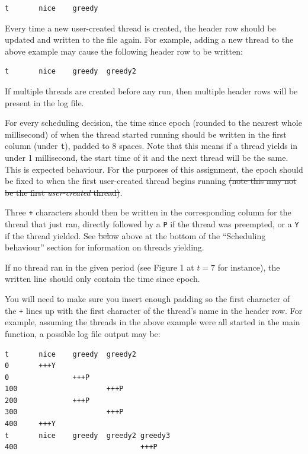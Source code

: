 \documentclass[12pt,a4paper]{article}
\begin{document}
\begin{verbatim}
t       nice    greedy
\end{verbatim}

Every time a new {\color{blue}user-created} thread is created, the header row should be updated and
written to the file again. For example, adding a new thread  to the above
example may cause the following header row to
be written:

\begin{verbatim}
t       nice    greedy  greedy2
\end{verbatim}

If multiple threads are created before any run, then multiple header rows will
be present in the log file.

For every scheduling decision, the time since epoch (rounded to the nearest
whole millisecond) of when the thread started running should be written in the
first column (under \texttt{t}), padded to 8 spaces. Note that this means if
a thread yields in under 1 millisecond, the start time of it and the next thread
will be the same. This is expected behaviour. For the purposes of this
assignment, the epoch should be fixed to when the first {\color{blue} user-created} thread begins running
{\color{blue}\sout{(note this may not be the first \textit{user-created} thread)}}.

Three \texttt{+} characters should then be written in the corresponding column
for the thread that just ran, directly followed by a \texttt{P} if the thread
was preempted, or a \texttt{Y} if the thread yielded.  See
{\color{red}\sout{below} above at the bottom of the ``Scheduling behaviour''
section} for information on threads yielding.

{\color{red}If no thread ran in the given period (see Figure 1 at $t=7$ for instance),
the written line should only contain the time since epoch.}

You will need to make sure you insert enough padding so the first character of
the \texttt{+} lines up with the first character of the thread's name in the
header row. For example, assuming the threads in the above example were
all started in the main function, a possible log file output may be:

\begin{verbatim}
t       nice    greedy  greedy2
0       +++Y
0               +++P
100                     +++P
200             +++P
300                     +++P
400     +++Y
t       nice    greedy  greedy2 greedy3
400                             +++P
\end{verbatim}
\end{document}
